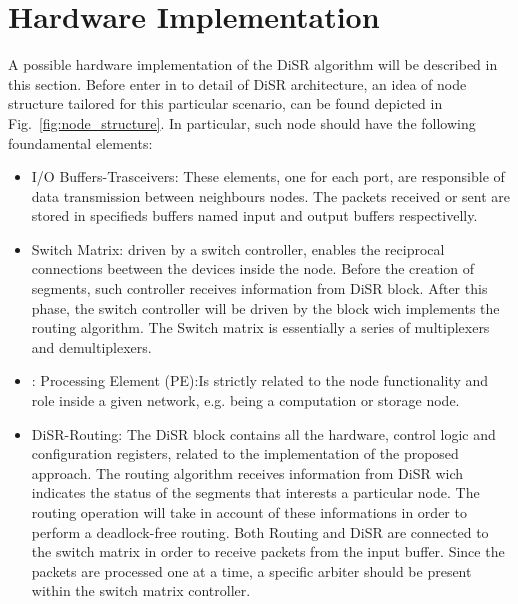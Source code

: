 \section{Hardware Implementation}
\label{sec:implementation}

A possible hardware implementation of the DiSR algorithm will be
described in this section.  Before enter in to detail of  DiSR
architecture,  an idea of node structure tailored for this particular
scenario, can be found depicted in Fig.~\ref{fig:node_structure}. In
particular, such node should have the following foundamental elements:

\begin{itemize}%

\item I/O Buffers-Trasceivers: These elements, one for
each port,  are responsible of data transmission between neighbours
nodes. The packets received or sent are stored in specifieds buffers
named input and output buffers respectivelly.

\item Switch Matrix: driven by a switch controller, enables the
reciprocal connections beetween the devices inside the node. Before
the creation of segments, such controller receives information from
DiSR block.  After this phase, the switch controller will be driven by
the block wich implements the routing algorithm. The Switch matrix is
essentially a series of multiplexers and demultiplexers.

\item : Processing Element (PE):Is strictly related to the node
functionality  and role inside a given network, e.g. being a
computation or storage node.

\item DiSR-Routing: The DiSR block contains all the hardware, control
logic and configuration registers, related to the implementation of the
proposed approach. The routing algorithm receives information
from DiSR  wich indicates the status of the segments that interests a
particular node. The routing operation will take in account of these
informations in order to perform a deadlock-free routing. Both Routing
and DiSR are connected to the switch matrix in order to receive
packets from the input buffer. Since the packets are processed one at
a time, a specific arbiter should be present within the switch matrix
controller. 

\end{itemize}%

